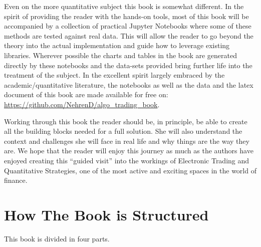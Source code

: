 Even on the more quantitative subject this book is somewhat different. In the spirit of providing the reader with the hands-on tools, most of this book will be accompanied by a collection of practical Jupyter Notebooks where some of these methods are tested against real data. This will allow the reader to go beyond the theory into the actual implementation and guide how to leverage existing libraries. Wherever possible the charts and tables in the book are generated directly by these notebooks and the data-sets provided bring further life into the treatment of the subject. In the excellent spirit largely embraced by the academic/quantitative literature, the notebooks as well as the data and the latex document of this book are made  available for free on: \url{https://github.com/NehrenD/algo_trading_book}.


Working through this book the reader should be, in principle, be able to create all the building blocks needed for a full solution. She will also understand the context and challenges she will face in real life and why things are the way they are. We hope that the reader will enjoy this journey as much as the authors have enjoyed creating this ``guided visit'' into the workings of Electronic Trading and Quantitative Strategies, one of the most active and exciting spaces in the world of finance.



\section{How The Book is Structured}

This book is divided in four parts. 

